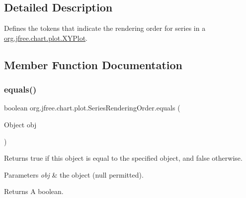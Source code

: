 \subsection{Detailed Description}
Defines the tokens that indicate the rendering order for series in a \mbox{\hyperlink{classorg_1_1jfree_1_1chart_1_1plot_1_1_x_y_plot}{org.\+jfree.\+chart.\+plot.\+X\+Y\+Plot}}. 

\subsection{Member Function Documentation}
\mbox{\label{classorg_1_1jfree_1_1chart_1_1plot_1_1_series_rendering_order_a863496eca631ebf7cb1fc632d8f0c480}} 
\subsubsection{\texorpdfstring{equals()}{equals()}}
{\footnotesize\ttfamily boolean org.\+jfree.\+chart.\+plot.\+Series\+Rendering\+Order.\+equals (\begin{DoxyParamCaption}\item[{Object}]{obj }\end{DoxyParamCaption})}

Returns {\ttfamily true} if this object is equal to the specified object, and {\ttfamily false} otherwise.


\begin{DoxyParams}{Parameters}
{\em obj} & the object ({\ttfamily null} permitted).\\
\hline
\end{DoxyParams}
\begin{DoxyReturn}{Returns}
A boolean. 
\end{DoxyReturn}
\mbox{\label{classorg_1_1jfree_1_1chart_1_1plot_1_1_series_rendering_order_a95fd7e430bdfa3ae939b91862d455926}} 
